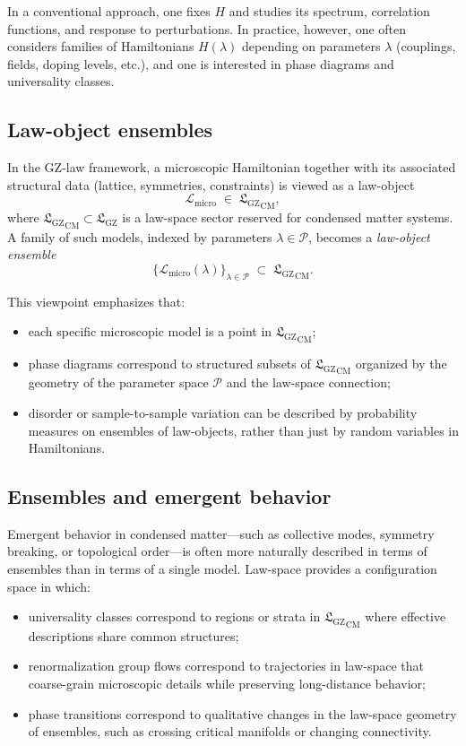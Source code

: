 \documentclass[11pt]{book}
\newcommand{\GZLS}{\ensuremath{\mathfrak{L}_{\mathrm{GZ}}}}
\theoremstyle{plain}
\theoremstyle{definition}
\theoremstyle{remark}
\begin{document}
In a conventional approach, one fixes $H$ and studies its spectrum,
correlation functions, and response to perturbations. In practice,
however, one often considers families of Hamiltonians $H(\lambda)$
depending on parameters $\lambda$ (couplings, fields, doping levels,
etc.), and one is interested in phase diagrams and universality
classes.

\subsection*{Law-object ensembles}

In the GZ-law framework, a microscopic Hamiltonian together with its
associated structural data (lattice, symmetries, constraints) is
viewed as a law-object
\[
   \mathcal{L}_{\mathrm{micro}} \;\in\; {\GZLS}_{\mathrm{CM}},
\]
where ${\GZLS}_{\mathrm{CM}} \subset {\GZLS}$ is a law-space sector
reserved for condensed matter systems. A family of such models,
indexed by parameters $\lambda \in \mathcal{P}$, becomes a
\emph{law-object ensemble}
\[
   \bigl\{\mathcal{L}_{\mathrm{micro}}(\lambda)\bigr\}_{\lambda\in\mathcal{P}}
   \;\subset\;
   {\GZLS}_{\mathrm{CM}}.
\]

This viewpoint emphasizes that:
\begin{itemize}
  \item each specific microscopic model is a point in ${\GZLS}_{\mathrm{CM}}$;
  \item phase diagrams correspond to structured subsets of
        ${\GZLS}_{\mathrm{CM}}$ organized by the geometry of the
        parameter space $\mathcal{P}$ and the law-space connection;
  \item disorder or sample-to-sample variation can be described by
        probability measures on ensembles of law-objects, rather
        than just by random variables in Hamiltonians.
\end{itemize}

\subsection*{Ensembles and emergent behavior}

Emergent behavior in condensed matter—such as collective modes,
symmetry breaking, or topological order—is often more naturally
described in terms of ensembles than in terms of a single model.
Law-space provides a configuration space in which:
\begin{itemize}
  \item universality classes correspond to regions or strata in
        ${\GZLS}_{\mathrm{CM}}$ where effective descriptions share
        common structures;
  \item renormalization group flows correspond to trajectories in
        law-space that coarse-grain microscopic details while
        preserving long-distance behavior;
  \item phase transitions correspond to qualitative changes in the
        law-space geometry of ensembles, such as crossing critical
        manifolds or changing connectivity.
\end{itemize}
\end{document}
